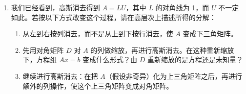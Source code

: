 \documentclass[UTF8,fontset=none,12pt]{ctexart}
\theoremstyle{definition}
\begin{document}
\begin{enumerate}[label=\textbf{20.\arabic*}]
    \item 我们已经看到，高斯消去得到 $A=LU$，其中 $L$ 的对角线为 1，而 $U$ 不一定如此。若按以下方式改变这个过程，请在高层次上描述所得的分解：
    \begin{enumerate}[label=(\alph*)]
        \item 从左到右按列消去，而不是从上到下按行消去，使 $A$ 变成下三角矩阵。
        \item 先用对角矩阵 $D$ 对 $A$ 的列做缩放，再进行高斯消去。在这种重新缩放下，方程组 $Ax=b$ 变成什么形式？由 $D$ 重新缩放的是方程还是未知量？
        \item 继续进行高斯消去：在把 $A$（假设非奇异）化为上三角矩阵之后，再进行额外的列操作，使这个上三角矩阵变成对角矩阵。
    \end{enumerate}
\end{enumerate}
\end{document}
